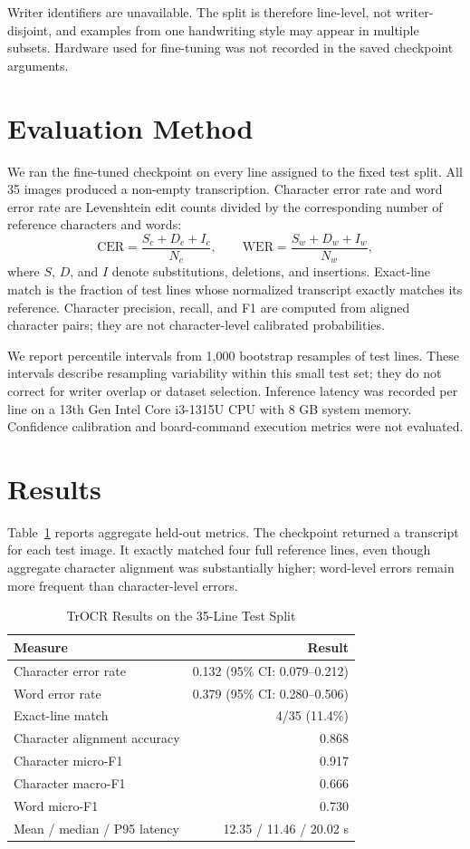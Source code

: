 \documentclass[conference]{IEEEtran}
\begin{document}
Writer identifiers are unavailable. The split is therefore line-level, not writer-disjoint, and examples from one handwriting style may appear in multiple subsets. Hardware used for fine-tuning was not recorded in the saved checkpoint arguments.

\section{Evaluation Method}
We ran the fine-tuned checkpoint on every line assigned to the fixed test split. All 35 images produced a non-empty transcription. Character error rate and word error rate are Levenshtein edit counts divided by the corresponding number of reference characters and words:
\begin{equation}
\mathrm{CER}=\frac{S_c+D_c+I_c}{N_c},\qquad
\mathrm{WER}=\frac{S_w+D_w+I_w}{N_w},
\end{equation}
where $S$, $D$, and $I$ denote substitutions, deletions, and insertions. Exact-line match is the fraction of test lines whose normalized transcript exactly matches its reference. Character precision, recall, and F1 are computed from aligned character pairs; they are not character-level calibrated probabilities.

We report percentile intervals from 1,000 bootstrap resamples of test lines. These intervals describe resampling variability within this small test set; they do not correct for writer overlap or dataset selection. Inference latency was recorded per line on a 13th Gen Intel Core i3-1315U CPU with 8 GB system memory. Confidence calibration and board-command execution metrics were not evaluated.

\section{Results}
Table~\ref{tab:metrics} reports aggregate held-out metrics. The checkpoint returned a transcript for each test image. It exactly matched four full reference lines, even though aggregate character alignment was substantially higher; word-level errors remain more frequent than character-level errors.

\begin{table}[t]
\caption{TrOCR Results on the 35-Line Test Split}
\label{tab:metrics}
\centering
\small
\begin{tabular}{lr}
\toprule
Measure & Result \\
\midrule
Character error rate & 0.132 (95\% CI: 0.079--0.212) \\
Word error rate & 0.379 (95\% CI: 0.280--0.506) \\
Exact-line match & 4/35 (11.4\%) \\
Character alignment accuracy & 0.868 \\
Character micro-F1 & 0.917 \\
Character macro-F1 & 0.666 \\
Word micro-F1 & 0.730 \\
Mean / median / P95 latency & 12.35 / 11.46 / 20.02 s \\
\bottomrule
\end{tabular}
\end{table}
\end{document}
